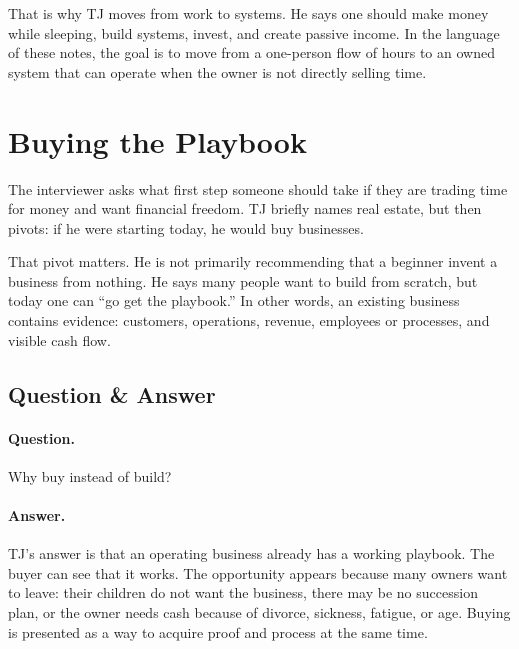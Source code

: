 That is why TJ moves from work to systems. He says one should make money while sleeping, build systems, invest, and create passive income. In the language of these notes, the goal is to move from a one-person flow of hours to an owned system that can operate when the owner is not directly selling time.

\section{Buying the Playbook}

The interviewer asks what first step someone should take if they are trading time for money and want financial freedom. TJ briefly names real estate, but then pivots: if he were starting today, he would buy businesses.

That pivot matters. He is not primarily recommending that a beginner invent a business from nothing. He says many people want to build from scratch, but today one can ``go get the playbook.'' In other words, an existing business contains evidence: customers, operations, revenue, employees or processes, and visible cash flow.

\subsection{Question \& Answer}

\paragraph{Question.} Why buy instead of build?

\paragraph{Answer.} TJ's answer is that an operating business already has a working playbook. The buyer can see that it works. The opportunity appears because many owners want to leave: their children do not want the business, there may be no succession plan, or the owner needs cash because of divorce, sickness, fatigue, or age. Buying is presented as a way to acquire proof and process at the same time.

